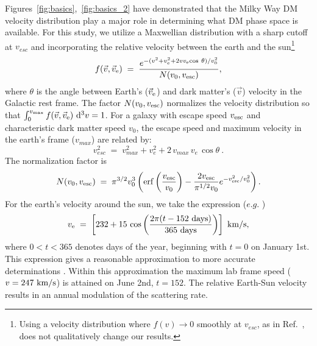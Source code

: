 \documentclass[11pt]{article}
\newcommand{\dd}{{\rm d}}
\begin{document}
Figures~\ref{fig:basics},~\ref{fig:basics_2} have demonstrated that the Milky Way DM velocity distribution play a major role in determining what DM phase space is available. For this study, we utilize a Maxwellian distribution with a sharp cutoff at $v_{esc}$ and incorporating the relative velocity between the earth and the sun\footnote{Using a velocity distribution where $f(v)\rightarrow 0$ smoothly at $v_{esc}$, as in Ref.~\cite{Lisanti:2010qx}, does not qualitatively change our results.}\,
\begin{equation}
f(\vec{v},\vec{v}_{\rm e}) \; = \; \frac{e^{-(v^2+v_{\rm e}^2+2v v_{\rm e}{\rm cos}~\theta)/v_0^2}}{N(v_0,v_{\rm esc})},
\end{equation}
where $\theta$ is the angle between Earth's ($\vec{v}_{\rm e}$) and dark matter's ($\vec{v}$) velocity in the Galactic rest frame. The 
factor $N(v_0,v_{\rm esc})$ normalizes the velocity distribution so that $\int_0^{v_{\rm max}} f( \vec{v} , \vec{v}_{\rm e} ) ~\dd^3 v=1$. For a galaxy with escape speed $v_{\rm esc}$ and characteristic dark matter speed $v_0$, the escape speed and maximum velocity in the earth's frame  ($v_{max}$) are related by:
\begin{equation}
v^2_{esc} \; = \; v^2_{max} + v^2_e + 2\, v_{max}\, v_e\, \cos{\theta}~.
\label{eq:angrest}
\end{equation}
The normalization factor is
\begin{equation}
N(v_0,v_{\rm esc}) \; = \; \pi^{3/2} v_0^3 \left( {\rm erf} \left(\frac{v_{\rm esc}}{v_0} \right)-\frac{2 v_{\rm esc}}{\pi^{1/2}v_0} e^{-v_{\rm esc}^2/v_0^2} \right).
\end{equation}
For the earth's velocity around the sun, we take the expression ($e.g.$ \cite{Lewin:1995rx})
\begin{equation}
v_{\rm e} \; = \; \left[ 232 + 15\, \cos \left( \frac{2 \pi(t-152~{\rm days})}{365~{\rm days}} \right) \right] ~{\rm km/s},
\label{eq:ve}
\end{equation}
where $0<t<365$ denotes days of the year, beginning with $t=0$ on January 1st.  This expression gives a reasonable approximation to more accurate determinations \cite{Lee:2013xxa,McCabe:2013kea}.  Within this approximation the maximum lab frame speed ($v= 247~ {\rm km/s}$) is attained on June 2nd, $t=152$. The relative Earth-Sun velocity results in an annual modulation of the scattering rate.
\end{document}
